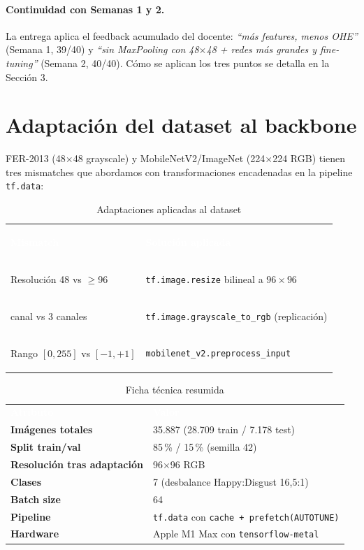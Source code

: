 \documentclass[10pt,a4paper,twocolumn]{article}
\begin{document}
\paragraph{Continuidad con Semanas 1 y 2.} La entrega aplica el feedback acumulado del docente: \textit{``más features, menos OHE''} (Semana 1, 39/40) y \textit{``sin MaxPooling con 48$\times$48 + redes más grandes y fine-tuning''} (Semana 2, 40/40). Cómo se aplican los tres puntos se detalla en la Sección 3.

\section{Adaptación del dataset al backbone}

FER-2013 (48$\times$48 grayscale) y MobileNetV2/ImageNet (224$\times$224 RGB) tienen tres mismatches que abordamos con transformaciones encadenadas en la pipeline \texttt{tf.data}:

\begin{table}[H]
\centering
\caption{Adaptaciones aplicadas al dataset}
\label{tab:adapt}
\footnotesize
\renewcommand{\arraystretch}{1.2}
\begin{tabularx}{\columnwidth}{>{\bfseries\raggedright\arraybackslash}p{2.4cm} X}
\rowcolor{tableheader}\textcolor{white}{\textbf{Mismatch}} & \textcolor{white}{\textbf{Solución aplicada}}\\
Resolución 48 vs $\geq$96 & \texttt{tf.image.resize} bilineal a $96\times 96$ \\
1 canal vs 3 canales & \texttt{tf.image.grayscale\_to\_rgb} (replicación) \\
Rango $[0,255]$ vs $[-1,+1]$ & \texttt{mobilenet\_v2.preprocess\_input} \\
\end{tabularx}
\end{table}

\begin{table}[H]
\centering
\caption{Ficha técnica resumida}
\label{tab:ficha}
\footnotesize
\renewcommand{\arraystretch}{1.15}
\begin{tabularx}{\columnwidth}{>{\bfseries}lX}
\rowcolor{tableheader}\textcolor{white}{\textbf{Atributo}} & \textcolor{white}{\textbf{Valor}}\\
Imágenes totales & 35.887 (28.709 train / 7.178 test) \\
Split train/val & 85\,\% / 15\,\% (semilla 42) \\
Resolución tras adaptación & 96$\times$96 RGB \\
Clases & 7 (desbalance Happy:Disgust 16,5:1) \\
Batch size & 64 \\
Pipeline & \texttt{tf.data} con \texttt{cache + prefetch(AUTOTUNE)} \\
Hardware & Apple M1 Max con \texttt{tensorflow-metal} \\
\end{tabularx}
\end{table}
\end{document}
